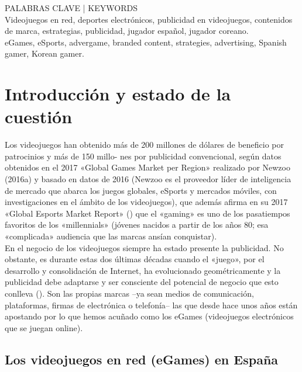 \documentclass[a4paper,11pt]{article}
\begin{document}
PALABRAS CLAVE | KEYWORDS\\
Videojuegos en red, deportes electrónicos, publicidad en videojuegos, contenidos de marca, estrategias, publicidad, jugador español, jugador coreano.\\
eGames, eSports, advergame, branded content, strategies, advertising, Spanish gamer, Korean gamer.

\section{Introducción y estado de la cuestión}
Los videojuegos han obtenido más de 200 millones de dólares de beneficio por patrocinios y más de 150 millo- nes por publicidad convencional, según datos obtenidos en el 2017 «Global Games Market per Region» realizado por Newzoo (2016a) y basado en datos de 2016 (Newzoo es el proveedor líder de inteligencia de mercado que abarca los juegos globales, eSports y mercados móviles, con investigaciones en el ámbito de los videojuegos), que además afirma en su 2017 «Global Esports Market Report» (\cite{VALENTINA2016}) que el «gaming» es uno de los pasatiempos favoritos de los «millennials» (jóvenes nacidos a partir de los años 80; esa «complicada» audiencia que las marcas ansían conquistar).\\ 
En el negocio de los videojuegos siempre ha estado presente la publicidad. No obstante, es durante estas dos últimas décadas cuando el «juego», por el desarrollo y consolidación de Internet, ha evolucionado geométricamente y la publicidad debe adaptarse y ser consciente del potencial de negocio que esto conlleva (\cite{Pedrycz2016}). Son las propias marcas –ya sean medios de comunicación, plataformas, firmas de electrónica o telefonía– las que desde hace unos años están apostando por lo que hemos acuñado como los eGames (videojuegos electrónicos que se juegan online)\cite{Agarwal2016}.

\subsection{Los videojuegos en red (eGames) en España}
\end{document}
